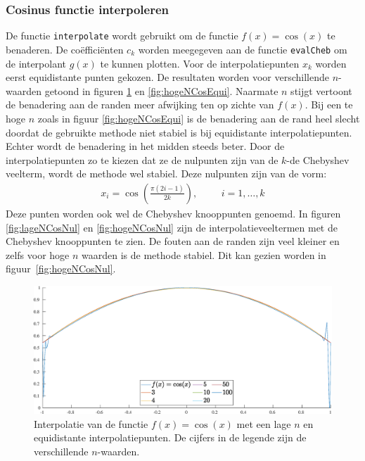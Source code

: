 \documentclass[a4paper, 12pt, titlepage, fleqn]{article}
\begin{document}
\subsubsection{Cosinus functie interpoleren}
\label{cosInterpoleren}
De functie \texttt{interpolate} wordt gebruikt om de functie $f(x) = \cos(x)$ te benaderen. De co\"effici\"enten $c_k$ worden meegegeven aan de functie \texttt{evalCheb} om de interpolant $g(x)$ te kunnen plotten. Voor de interpolatiepunten $x_k$ worden eerst equidistante punten gekozen. De resultaten worden voor verschillende $n$-waarden getoond in figuren \ref{lageNCosEqui} en \ref{fig:hogeNCosEqui}. Naarmate $n$ stijgt vertoont de benadering aan de randen meer afwijking ten op zichte van $f(x)$. Bij een te hoge $n$ zoals in figuur \ref{fig:hogeNCosEqui} is de benadering aan de rand heel slecht doordat de gebruikte methode niet stabiel is bij equidistante interpolatiepunten. Echter wordt de benadering in het midden steeds beter. Door de interpolatiepunten zo te kiezen dat ze de nulpunten zijn van de $k$-de Chebyshev veelterm, wordt de methode wel stabiel. Deze nulpunten zijn van de vorm:
\begin{align*}
x_i = \cos\left(\frac{\pi(2i-1)}{2k}\right), \hspace{1cm} i = 1,\ldots,k
\end{align*}
Deze punten worden ook wel de Chebyshev knooppunten genoemd. In figuren \ref{fig:lageNCosNul} en \ref{fig:hogeNCosNul} zijn de interpolatieveeltermen met de Chebyshev knooppunten te zien. De fouten aan de randen zijn veel kleiner en zelfs voor hoge $n$ waarden is de methode stabiel. Dit kan gezien worden in figuur~\ref{fig:hogeNCosNul}.


\begin{figure}
\centering
\includegraphics[scale=0.4]{../Afbeeldingen/cos_equi_laag.eps}
\caption{Interpolatie van de functie $f(x) = \cos(x)$ met een lage $n$ en equidistante interpolatiepunten. De cijfers in de legende zijn de verschillende $n$-waarden.}
\label{lageNCosEqui}
\end{figure}
\end{document}
